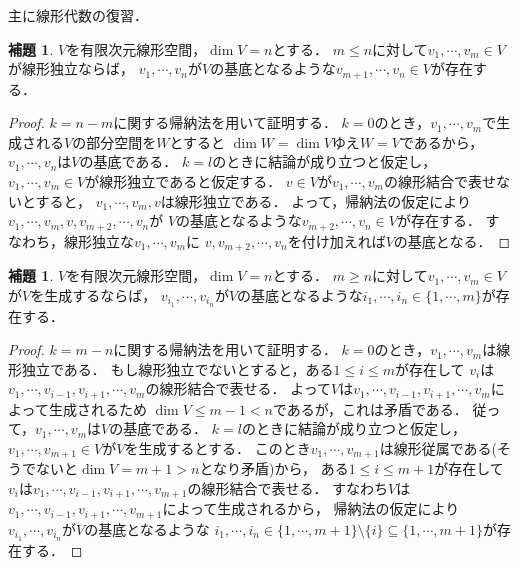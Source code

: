 \documentclass{jsarticle}
\theoremstyle{definition}
\newtheorem{lem}[defi]{補題}
\begin{document}
主に線形代数の復習．

\begin{lem}
$V$を有限次元線形空間，$\dim V=n$とする．
$m\leq n$に対して$v_1,\cdots,v_m\in V$が線形独立ならば，
$v_1,\cdots,v_n$が$V$の基底となるような$v_{m+1},\cdots,v_n\in V$が存在する．
\end{lem}

\begin{proof}
$k=n-m$に関する帰納法を用いて証明する．
$k=0$のとき，$v_1,\cdots,v_m$で生成される$V$の部分空間を$W$とすると
$\dim W=\dim V$ゆえ$W=V$であるから，
$v_1,\cdots,v_n$は$V$の基底である．
$k=l$のときに結論が成り立つと仮定し，
$v_1,\cdots,v_m\in V$が線形独立であると仮定する．
$v\in V$が$v_1,\cdots,v_m$の線形結合で表せないとすると，
$v_1,\cdots,v_m,v$は線形独立である．
よって，帰納法の仮定により$v_1,\cdots,v_m,v,v_{m+2},\cdots,v_n$が
$V$の基底となるような$v_{m+2},\cdots,v_n\in V$が存在する．
すなわち，線形独立な$v_1,\cdots,v_m$に
$v,v_{m+2},\cdots,v_n$を付け加えれば$V$の基底となる．
\end{proof}

\begin{lem}
$V$を有限次元線形空間，$\dim V=n$とする．
$m\geq n$に対して$v_1,\cdots,v_m\in V$が$V$を生成するならば，
$v_{i_1},\cdots,v_{i_n}$が$V$の基底となるような$i_1,\cdots,i_n\in\{1,\cdots,m\}$が存在する．
\end{lem}

\begin{proof}
$k=m-n$に関する帰納法を用いて証明する．
$k=0$のとき，$v_1,\cdots,v_m$は線形独立である．
もし線形独立でないとすると，ある$1\leq i\leq m$が存在して
$v_i$は$v_1,\cdots,v_{i-1},v_{i+1},\cdots,v_m$の線形結合で表せる．
よって$V$は$v_1,\cdots,v_{i-1},v_{i+1},\cdots,v_m$によって生成されるため
$\dim V\leq m-1<n$であるが，これは矛盾である．
従って，$v_1,\cdots,v_m$は$V$の基底である．
$k=l$のときに結論が成り立つと仮定し，
$v_1,\cdots,v_{m+1}\in V$が$V$を生成するとする．
このとき$v_1,\cdots,v_{m+1}$は線形従属である(そうでないと$\dim V=m+1>n$となり矛盾)から，
ある$1\leq i\leq m+1$が存在して
$v_i$は$v_1,\cdots,v_{i-1},v_{i+1},\cdots,v_{m+1}$の線形結合で表せる．
すなわち$V$は$v_1,\cdots,v_{i-1},v_{i+1},\cdots,v_{m+1}$によって生成されるから，
帰納法の仮定により
$v_{i_1},\cdots,v_{i_n}$が$V$の基底となるような
$i_1,\cdots,i_n\in\{1,\cdots,m+1\}\setminus\{i\}\subseteq\{1,\cdots,m+1\}$が存在する．
\end{proof}
\end{document}
